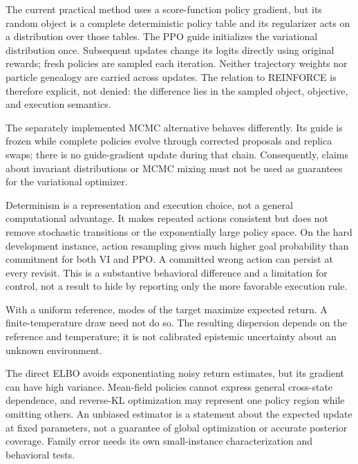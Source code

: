 \label{sec:discussion}


The current practical method uses a score-function policy gradient, but its
random object is a complete deterministic policy table and its regularizer
acts on a distribution over those tables. The PPO guide initializes the
variational distribution once. Subsequent updates change its logits directly
using original rewards; fresh policies are sampled each iteration. Neither
trajectory weights nor particle genealogy are carried across updates.
The relation to REINFORCE is therefore explicit, not denied: the difference
lies in the sampled object, objective, and execution semantics.

The separately implemented MCMC alternative behaves differently. Its guide
is frozen while complete policies evolve through corrected proposals and
replica swaps; there is no guide-gradient update during that chain.
Consequently, claims about invariant distributions or MCMC mixing must not
be used as guarantees for the variational optimizer.

Determinism is a representation and execution choice, not a general
computational advantage. It makes repeated actions consistent but does not
remove stochastic transitions or the exponentially large policy space.
On the hard development instance, action resampling gives much higher goal
probability than commitment for both VI and PPO. A committed wrong action
can persist at every revisit. This is a substantive behavioral difference
and a limitation for control, not a result to hide by reporting only the
more favorable execution rule.


With a uniform reference, modes of the target maximize expected return.
A finite-temperature draw need not do so. The resulting dispersion depends
on the reference and temperature; it is not calibrated epistemic uncertainty
about an unknown environment.

The direct ELBO avoids exponentiating noisy return estimates, but its
gradient can have high variance. Mean-field policies cannot express general
cross-state dependence, and reverse-KL optimization may represent one policy
region while omitting others. An unbiased estimator is a statement about
the expected update at fixed parameters, not a guarantee of global
optimization or accurate posterior coverage. Family error needs its own
small-instance characterization and behavioral tests.


